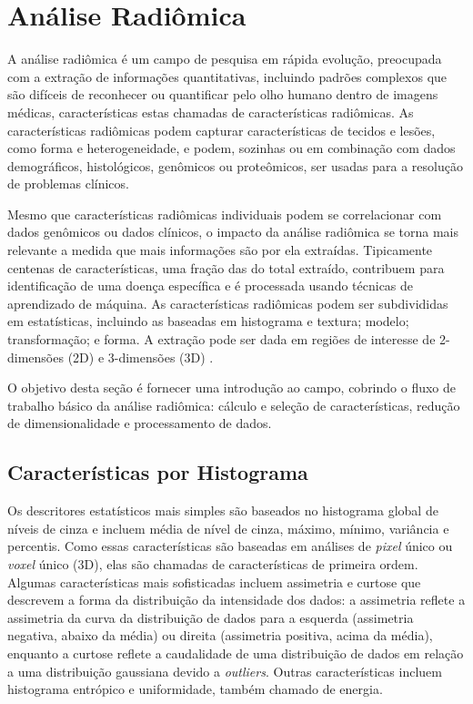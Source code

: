 \section{Análise Radiômica}
\label{sec:analise_radiomica}

A análise radiômica é um campo de pesquisa em rápida evolução, preocupada com a extração de informações quantitativas, incluindo padrões complexos que são difíceis de reconhecer ou quantificar pelo olho humano dentro de imagens médicas, características estas chamadas de características radiômicas. As características radiômicas podem capturar características de tecidos e lesões, como forma e heterogeneidade, e podem, sozinhas ou em combinação com dados demográficos, histológicos, genômicos ou proteômicos, ser usadas para a resolução de problemas clínicos.

Mesmo que características radiômicas individuais podem se correlacionar com dados genômicos ou dados clínicos, o impacto da análise radiômica se torna mais relevante a medida que mais informações são por ela extraídas. Tipicamente centenas de características, uma fração das do total extraído, contribuem para identificação de uma doença específica e é processada usando técnicas de aprendizado de máquina. As características radiômicas podem ser subdivididas em estatísticas, incluindo as baseadas em histograma e textura; modelo; transformação; e forma. A extração pode ser dada em regiões de interesse de 2-dimensões (2D) e 3-dimensões (3D)  \cite{mayerhoeferIntroductionRadiomics2020}.

 O objetivo desta seção é fornecer uma introdução ao campo, cobrindo o fluxo de trabalho básico da análise radiômica: cálculo e seleção de características, redução de dimensionalidade e processamento de dados.
\subsection{Características por Histograma}

Os descritores estatísticos mais simples são baseados no histograma global de níveis de cinza e incluem média de nível de cinza, máximo, mínimo, variância e percentis. Como essas características são baseadas em análises de \textit{pixel} único ou \textit{voxel} único (3D), elas são chamadas de características de primeira ordem. Algumas características mais sofisticadas incluem assimetria e curtose que descrevem a forma da distribuição da intensidade dos dados: a assimetria reflete a assimetria da curva da distribuição de dados para a esquerda (assimetria negativa, abaixo da média) ou direita (assimetria positiva, acima da média), enquanto a curtose reflete a caudalidade de uma distribuição de dados em relação a uma distribuição gaussiana devido a \textit{outliers}. Outras características incluem histograma entrópico e uniformidade, também chamado de energia.

